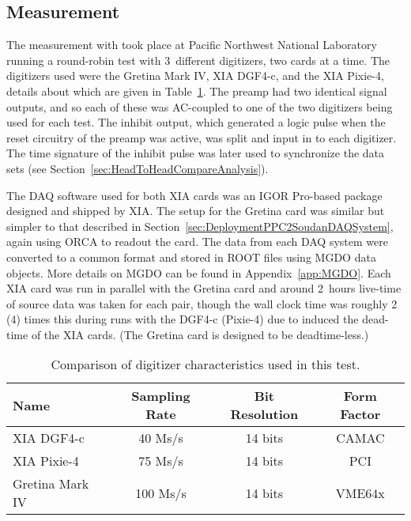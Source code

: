 		\subsection{Measurement}
	     	\label{sec:HeadToHeadCompareMeasurement}     
	The measurement with  took place at Pacific Northwest National Laboratory running a round-robin test with 3~different digitizers, two cards at a time.  The digitizers used were the Gretina Mark IV, XIA DGF4-c, and the XIA Pixie-4, details about which are given in Table~\ref{tab:HeadToHeadComparisonDetectorChars}.  The  preamp had two identical signal outputs, and so each of these was AC-coupled to one of the two digitizers being used for each test.  The inhibit output, which generated a logic pulse when the reset circuitry of the preamp was active, was split and input in to each digitizer.  The time signature of the inhibit pulse was later used to synchronize the data sets (see Section~\ref{sec:HeadToHeadCompareAnalysis}).  
	
	The DAQ software used for both XIA cards was an IGOR Pro-based package designed and shipped by XIA.  	The setup for the Gretina card was similar but simpler to that described in Section~\ref{sec:DeploymentPPC2SoudanDAQSystem}, again using ORCA to readout the card.  The data from each DAQ system were converted to a common format and stored in ROOT files using MGDO data objects.  More details on MGDO can be found in Appendix~\ref{app:MGDO}.  Each XIA card was run in parallel with the Gretina card and around 2~hours live-time of source data was taken for each pair, though the wall clock time was roughly 2 (4) times this during runs with the DGF4-c (Pixie-4) due to induced the dead-time of the XIA cards.  (The Gretina card is designed to be deadtime-less.)  
		
			\begin{table}
				\centering
				\begin{tabular}{l|c|c|c}
					Name & Sampling Rate & Bit Resolution & Form Factor \\
					\hline
					XIA DGF4-c & 40 Ms/s & 14 bits & CAMAC \\
					\hline
					XIA Pixie-4 &  75 Ms/s & 14 bits & PCI \\
					\hline
					Gretina Mark IV &  100 Ms/s & 14 bits & VME64x \\										
					\hline					
				\end{tabular}
				\caption[Comparison of digitizer characteristics]
				{Comparison of digitizer characteristics used in this test.}
				\label{tab:HeadToHeadComparisonDetectorChars}
			\end{table}	
		
